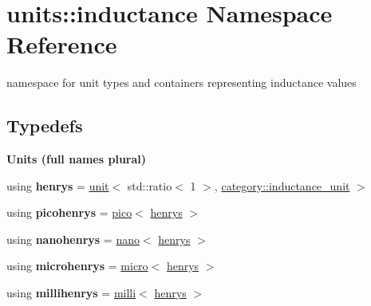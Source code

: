 \hypertarget{namespaceunits_1_1inductance}{}\section{units\+:\+:inductance Namespace Reference}
\label{namespaceunits_1_1inductance}


namespace for unit types and containers representing inductance values  


\subsection*{Typedefs}
\begin{Indent}{\bf Units (full names plural)}\par
\begin{DoxyCompactItemize}
\item 
\hypertarget{namespaceunits_1_1inductance_a798853c3214bdae603d44b38a5918f1b}{}using {\bfseries henrys} = \hyperlink{structunits_1_1unit}{unit}$<$ std\+::ratio$<$ 1 $>$, \hyperlink{namespaceunits_1_1category_ad0714439849450c6ad18b82777cb3884}{category\+::inductance\+\_\+unit} $>$\label{namespaceunits_1_1inductance_a798853c3214bdae603d44b38a5918f1b}

\item 
\hypertarget{namespaceunits_1_1inductance_ad553e9b7f3fbc0d4d28160bc142e9b68}{}using {\bfseries picohenrys} = \hyperlink{group___unit_manipulators_ga82a8d14a3e0877a375a66b64c45baab9}{pico}$<$ \hyperlink{structunits_1_1unit}{henrys} $>$\label{namespaceunits_1_1inductance_ad553e9b7f3fbc0d4d28160bc142e9b68}

\item 
\hypertarget{namespaceunits_1_1inductance_ab71ae2748ee3163f03d66c91e37de675}{}using {\bfseries nanohenrys} = \hyperlink{group___unit_manipulators_ga1c25c3c1d6c1f3aed3fd1ecf043110d5}{nano}$<$ \hyperlink{structunits_1_1unit}{henrys} $>$\label{namespaceunits_1_1inductance_ab71ae2748ee3163f03d66c91e37de675}

\item 
\hypertarget{namespaceunits_1_1inductance_a76b7de88ae177ef66e940a66e9b31843}{}using {\bfseries microhenrys} = \hyperlink{group___unit_manipulators_gaea53c906ec805110b93f02db4a961971}{micro}$<$ \hyperlink{structunits_1_1unit}{henrys} $>$\label{namespaceunits_1_1inductance_a76b7de88ae177ef66e940a66e9b31843}

\item 
\hypertarget{namespaceunits_1_1inductance_aefbd0be9eb105f4a642b19722e518110}{}using {\bfseries millihenrys} = \hyperlink{group___unit_manipulators_gaec9d1c320e180eb59f3cb3094d8079dd}{milli}$<$ \hyperlink{structunits_1_1unit}{henrys} $>$\label{namespaceunits_1_1inductance_aefbd0be9eb105f4a642b19722e518110}


\end{DoxyCompactItemize}
\end{Indent}
